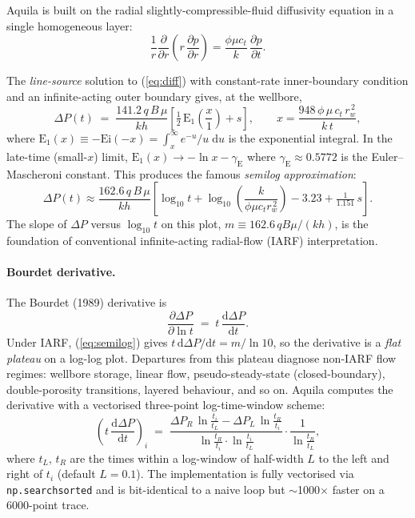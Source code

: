 \documentclass[11pt,a4paper]{article}
\newcommand{\D}{\mathrm{d}}
\newcommand{\Ein}{\mathrm{E}_1}
\newcommand{\kh}{kh}
\newcommand{\Ei}{\mathrm{Ei}}
\begin{document}
Aquila is built on the radial slightly-compressible-fluid diffusivity
equation in a single homogeneous layer:
\begin{equation}
    \frac{1}{r}\frac{\partial}{\partial r}\!\left(r\,\frac{\partial p}{\partial r}\right)
    = \frac{\phi \mu c_t}{k}\,\frac{\partial p}{\partial t}.
    \label{eq:diff}
\end{equation}

The \emph{line-source} solution to (\ref{eq:diff}) with constant-rate
inner-boundary condition and an infinite-acting outer boundary gives, at
the wellbore,
\begin{equation}
    \Delta P(t)
    \;=\;
    \frac{141.2\,q\,B\,\mu}{\kh}
    \left[
        \tfrac{1}{2}\,\Ein\!\!\left(\frac{x}{1}\right) + s
    \right],
    \qquad
    x = \frac{948\,\phi\,\mu\,c_t\,r_w^{\,2}}{k\,t},
    \label{eq:linesrc}
\end{equation}
where $\Ein(x)\equiv -\Ei(-x)=\int_x^\infty\!e^{-u}/u\;\D u$ is the
exponential integral. In the late-time (small-$x$) limit, $\Ein(x)\to
-\ln x - \gamma_{\mathrm{E}}$ where $\gamma_{\mathrm{E}}\approx 0.5772$
is the Euler--Mascheroni constant. This produces the famous
\emph{semilog approximation}:
\begin{equation}
    \Delta P(t) \approx
    \frac{162.6\,q\,B\,\mu}{\kh}
    \!\left[
        \log_{10} t + \log_{10}\!\left(\frac{k}{\phi\mu c_t r_w^{\,2}}\right)
        - 3.23 + \tfrac{1}{1.151}\,s
    \right].
    \label{eq:semilog}
\end{equation}
The slope of $\Delta P$ versus $\log_{10}t$ on this plot,
$m \equiv 162.6\,qB\mu/(\kh)$, is the foundation of conventional
infinite-acting radial-flow (IARF) interpretation.

\paragraph{Bourdet derivative.}
The Bourdet (1989) derivative is
\begin{equation}
    \frac{\partial \Delta P}{\partial \ln t}
    \;=\;
    t\,\frac{\D \Delta P}{\D t}.
    \label{eq:bourdet}
\end{equation}
Under IARF, (\ref{eq:semilog}) gives
$t\,\D\Delta P/\D t = m/\ln 10$, so the derivative is a \emph{flat
plateau} on a log-log plot. Departures from this plateau diagnose
non-IARF flow regimes: wellbore storage, linear flow, pseudo-steady-state
(closed-boundary), double-porosity transitions, layered behaviour, and
so on. Aquila computes the derivative with a vectorised three-point
log-time-window scheme:
\begin{equation}
    \left(t\,\frac{\D \Delta P}{\D t}\right)_{\!i}
    \;=\;
    \frac{
        \Delta P_R\,\ln\!\tfrac{t_i}{t_L} - \Delta P_L\,\ln\!\tfrac{t_R}{t_i}
    }{
        \ln\!\tfrac{t_R}{t_i} \cdot \ln\!\tfrac{t_i}{t_L}
    }
    \cdot
    \frac{1}{\ln\!\tfrac{t_R}{t_L}},
\end{equation}
where $t_L,\,t_R$ are the times within a log-window of half-width $L$
to the left and right of $t_i$ (default $L=0.1$). The implementation is
fully vectorised via \texttt{np.searchsorted} and is bit-identical to a
naive loop but $\sim$1000$\times$ faster on a 6000-point trace.
\end{document}

